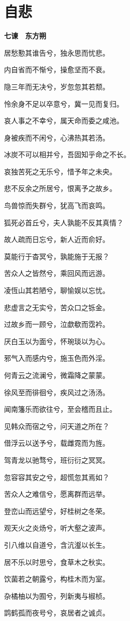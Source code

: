 \documentclass[12pt,a4paper]{ctexbook}
\begin{document}
\section{自悲}
\textbf{七谏　东方朔}\par\vspace{0.5em}
居愁懃其谁告兮，独永思而忧悲。\par
内自省而不惭兮，操愈坚而不衰。\par
隐三年而无决兮，岁忽忽其若颓。\par
怜余身不足以卒意兮，冀一见而复归。\par
哀人事之不幸兮，属天命而委之咸池。\par
身被疾而不闲兮，心沸热其若汤。\par
冰炭不可以相并兮，吾固知乎命之不长。\par
哀独苦死之无乐兮，惜予年之未央。\par
悲不反余之所居兮，恨离予之故乡。\par
鸟兽惊而失群兮，犹高飞而哀鸣。\par
狐死必首丘兮，夫人孰能不反其真情？\par
故人疏而日忘兮，新人近而俞好。\par
莫能行于杳冥兮，孰能施于无报？\par
苦众人之皆然兮，乘回风而远游。\par
凌恆山其若陋兮，聊愉娱以忘忧。\par
悲虚言之无实兮，苦众口之铄金。\par
过故乡而一顾兮，泣歔欷而霑衿。\par
厌白玉以为面兮，怀琬琰以为心。\par
邪气入而感内兮，施玉色而外淫。\par
何青云之流澜兮，微霜降之蒙蒙。\par
徐风至而徘徊兮，疾风过之汤汤。\par
闻南籓乐而欲往兮，至会稽而且止。\par
见韩众而宿之兮，问天道之所在？\par
借浮云以送予兮，载雌霓而为旌。\par
驾青龙以驰骛兮，班衍衍之冥冥。\par
忽容容其安之兮，超慌忽其焉如？\par
苦众人之难信兮，愿离群而远举。\par
登峦山而远望兮，好桂树之冬荣。\par
观天火之炎炀兮，听大壑之波声。\par
引八维以自道兮，含沆瀣以长生。\par
居不乐以时思兮，食草木之秋实。\par
饮菌若之朝露兮，构桂木而为室。\par
杂橘柚以为囿兮，列新夷与椒桢。\par
鹍鹤孤而夜号兮，哀居者之诚贞。\par
\end{document}
